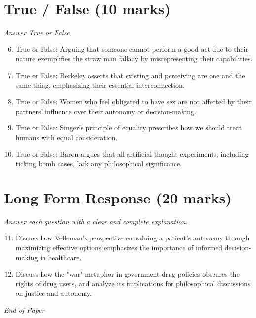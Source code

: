 \documentclass[12pt]{article}
\begin{document}
\section*{True / False (10 marks)}
\textit{Answer True or False}
\begin{enumerate}[label=\arabic*.]
\setcounter{enumi}{5}
\item True or False: Arguing that someone cannot perform a good act due to their nature exemplifies the straw man fallacy by misrepresenting their capabilities.
\item True or False: Berkeley asserts that existing and perceiving are one and the same thing, emphasizing their essential interconnection.
\item True or False: Women who feel obligated to have sex are not affected by their partners' influence over their autonomy or decision-making.
\item True or False: Singer's principle of equality prescribes how we should treat humans with equal consideration.
\item True or False: Baron argues that all artificial thought experiments, including ticking bomb cases, lack any philosophical significance.
\end{enumerate}

\section*{Long Form Response (20 marks)}
\textit{Answer each question with a clear and complete explanation.}
\begin{enumerate}[label=\arabic*.]
\setcounter{enumi}{10}
\item Discuss how Velleman's perspective on valuing a patient's autonomy through maximizing effective options emphasizes the importance of informed decision-making in healthcare.
\item Discuss how the "war" metaphor in government drug policies obscures the rights of drug users, and analyze its implications for philosophical discussions on justice and autonomy.
\end{enumerate}

\vfill
\noindent\textit{End of Paper}
\end{document}
